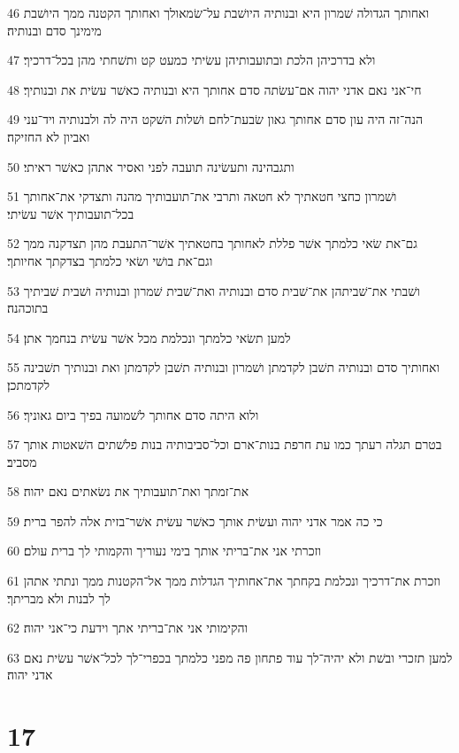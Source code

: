 \par 46 ואחותך הגדולה שׁמרון היא ובנותיה היושׁבת על־שׂמאולך ואחותך הקטנה ממך היושׁבת מימינך סדם ובנותיה׃
\par 47 ולא בדרכיהן הלכת ובתועבותיהן עשׂיתי כמעט קט ותשׁחתי מהן בכל־דרכיך׃
\par 48 חי־אני נאם אדני יהוה אם־עשׂתה סדם אחותך היא ובנותיה כאשׁר עשׂית את ובנותיך׃
\par 49 הנה־זה היה עון סדם אחותך גאון שׂבעת־לחם ושׁלות השׁקט היה לה ולבנותיה ויד־עני ואביון לא החזיקה׃
\par 50 ותגבהינה ותעשׂינה תועבה לפני ואסיר אתהן כאשׁר ראיתי׃
\par 51 ושׁמרון כחצי חטאתיך לא חטאה ותרבי את־תועבותיך מהנה ותצדקי את־אחותך בכל־תועבותיך אשׁר עשׂיתי׃
\par 52 גם־את שׂאי כלמתך אשׁר פללת לאחותך בחטאתיך אשׁר־התעבת מהן תצדקנה ממך וגם־את בושׁי ושׂאי כלמתך בצדקתך אחיותך׃
\par 53 ושׁבתי את־שׁביתהן את־שׁבית סדם ובנותיה ואת־שׁבית שׁמרון ובנותיה ושׁבית שׁביתיך בתוכהנה׃
\par 54 למען תשׂאי כלמתך ונכלמת מכל אשׁר עשׂית בנחמך אתן׃
\par 55 ואחותיך סדם ובנותיה תשׁבן לקדמתן ושׁמרון ובנותיה תשׁבן לקדמתן ואת ובנותיך תשׁבינה לקדמתכן׃
\par 56 ולוא היתה סדם אחותך לשׁמועה בפיך ביום גאוניך׃
\par 57 בטרם תגלה רעתך כמו עת חרפת בנות־ארם וכל־סביבותיה בנות פלשׁתים השׁאטות אותך מסביב׃
\par 58 את־זמתך ואת־תועבותיך את נשׂאתים נאם יהוה׃
\par 59 כי כה אמר אדני יהוה ועשׂית אותך כאשׁר עשׂית אשׁר־בזית אלה להפר ברית׃
\par 60 וזכרתי אני את־בריתי אותך בימי נעוריך והקמותי לך ברית עולם׃
\par 61 וזכרת את־דרכיך ונכלמת בקחתך את־אחותיך הגדלות ממך אל־הקטנות ממך ונתתי אתהן לך לבנות ולא מבריתך׃
\par 62 והקימותי אני את־בריתי אתך וידעת כי־אני יהוה׃
\par 63 למען תזכרי ובשׁת ולא יהיה־לך עוד פתחון פה מפני כלמתך בכפרי־לך לכל־אשׁר עשׂית נאם אדני יהוה׃

\chapter{17}

